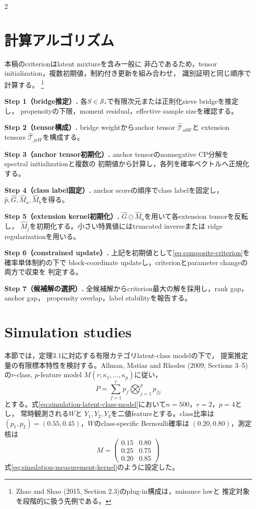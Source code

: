 \documentclass[a4paper,10pt]{article}
\begin{document}
\begin{multicols}{2}
\section{計算アルゴリズム}
本稿のcriterionはlatent mixtureを含み一般に
非凸であるため，tensor initialization，複数初期値，制約付き更新を組み合わせ，
識別証明と同じ順序で計算する。%
\footnote{Zhao and Shao (2015, Section 2.3)のplug-in構成は，nuisance lawと
推定対象を段階的に扱う先例である。}

\noindent\textbf{Step 1（bridge推定）.}
各$S\in\mathcal S_*$で有限次元または正則化sieve bridgeを推定し，
propensityの下限，moment residual，effective sample sizeを確認する。

\noindent\textbf{Step 2（tensor構成）.}
bridge weightからanchor tensor $\widehat{\mathcal T}_{abW}$と
extension tensors $\widehat{\mathcal T}_{jaW}$を構成する。

\noindent\textbf{Step 3（anchor tensor初期化）.}
anchor tensorのnonnegative CP分解をspectral initializationと複数の
初期値から計算し，各列を確率ベクトルへ正規化する。

\noindent\textbf{Step 4（class label固定）.}
anchor scoreの順序でclass labelを固定し，$\widehat p,\widehat G,
\widehat M_a,\widehat M_b$を得る。

\noindent\textbf{Step 5（extension kernel初期化）.}
$\widehat G\odot\widehat M_a$を用いて各extension tensorを反転し，
$\widehat M_j$を初期化する。小さい特異値にはtruncated inverseまたは
ridge regularizationを用いる。

\noindent\textbf{Step 6（constrained update）.}
上記を初期値として\eqref{eq:composite-criterion}を確率単体制約の下で
block-coordinate updateし，criterionとparameter changeの両方で収束を
判定する。

\noindent\textbf{Step 7（候補解の選択）.}
全候補解からcriterion最大の解を採用し，rank gap，anchor gap，
propensity overlap，label stabilityを報告する。

\section{Simulation studies}
本節では，定理3.1に対応する有限カテゴリlatent-class modelの下で，
提案推定量の有限標本特性を検討する。Allman, Matias and Rhodes
(2009, Sections 3--5)の$r$-class, $p$-feature model
$M(r;\kappa_1,\ldots,\kappa_p)$に従い，
\begin{equation}
P=\sum_{f=1}^r p_f\bigotimes_{j=1}^p p_{fj}
\label{eq:simulation-latent-class-model}
\end{equation}
とする。式\eqref{eq:simulation-latent-class-model}において$n=500$，$r=2$，$p=4$とし，
常時観測される$W$と
$Y_1,Y_2,Y_3$を二値featureとする。class比率は
$(p_1,p_2)=(0.55,0.45)$，$W$のclass-specific Bernoulli確率は
$(0.20,0.80)$，測定核は
\begin{equation}
M=\begin{pmatrix}
0.15&0.80\\
0.25&0.75\\
0.20&0.85
\end{pmatrix}
\label{eq:simulation-measurement-kernel}
\end{equation}
式\eqref{eq:simulation-measurement-kernel}のように設定した。


\end{multicols}
\end{document}
